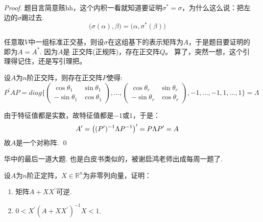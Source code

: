 \begin{proof}
	题目言简意赅hh，这个内积一看就知道要证明$\sigma^\ast = \sigma$，为什么这么说：把左边的$\sigma$踢过去.
	$$
		\bigl( \sigma(\alpha), \beta \bigr) = \bigl( \alpha, \sigma^\ast (\beta)\bigr)
	$$

	任意取$V$中一组标准正交基，则设$\sigma$在这组基下的表示矩阵为$A$，于是题目要证明的即为$A=A^\ast$. 因为$A$是
	正交阵(正规阵)，存在正交阵$Q$。  算了，突然一想，这个引理得记住，还是写引理把。

	\begin{lemma}[正交阵的正交相似标准型]
		设$A$为$n$阶正交阵，则存在正交阵$P$使得:
		$$
			P^\prime A P = diag \{ \begin{pmatrix}
				\cos \theta_1 & \sin \theta_1 \\
				-\sin \theta_1 & \cos \theta_1
			\end{pmatrix}, \dots, \begin{pmatrix}
				\cos \theta_r & \sin \theta_r \\
				-\sin \theta_r & \cos \theta_r
			\end{pmatrix}, -1,\dots,-1,1,\dots,1 \}=\Lambda 
		$$
	\end{lemma}
	由于特征值都是实数，故特征值都是$-1$或$1$，于是：
	$$
		A^{\prime} = \left( (P^{\prime})^{-1} \Lambda P^{-1} \right)^\prime = P  \Lambda P^{\prime} = A
	$$
	故$A$是一个对称阵.
	\qed{}
\end{proof}

华中的最后一道大题. 也是白皮书类似的，被谢启鸿老师出成每周一题了.

\begin{ex}[华中2021]
	设$A$为$n$阶正定阵，$X\in \mathbb{R}^n$为非零列向量，证明：
	\begin{enumerate}[(1)]
		\item 矩阵$A+XX^\prime$可逆.
		\item $0<X^\prime (A+XX^\prime)^{-1}X<1$.
	\end{enumerate}
\end{ex}

